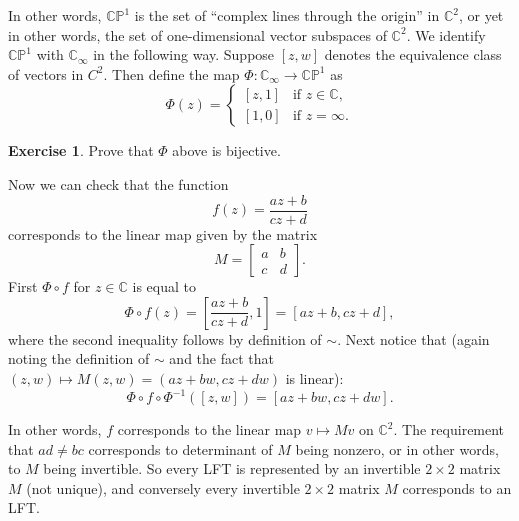 \documentclass[12pt,openany]{book}
\newcommand{\C}{{\mathbb{C}}}
\newcommand{\bP}{{\mathbb{P}}}
\theoremstyle{plain}
\theoremstyle{remark}
\theoremstyle{definition}
\newenvironment{exbox}{%
    \def\FrameCommand{\vrule width 1pt \relax\hspace {10pt}}%
    \MakeFramed {\advance \hsize -\width \FrameRestore }%
}{%
    \endMakeFramed
}
\theoremstyle{exercise}
\newtheorem{exercise}{Exercise}[section]
\theoremstyle{example}
\begin{document}
In other words, $\C \bP^1$ is the set of ``complex lines through the
origin'' in $\C^2$, or yet in other words, the set of one-dimensional vector
subspaces of $\C^2$.  We identify $\C\bP^1$ with $\C_\infty$ in the following
way.  Suppose $[z,w]$ denotes the equivalence class of vectors in $C^2$.
Then define the map $\Phi \colon \C_\infty \to \C \bP^1$ as
\begin{equation*}
\Phi(z) =
\begin{cases}
[z,1] & \text{if } z \in \C , \\
[1,0] & \text{if } z=\infty .
\end{cases}
\end{equation*}

\begin{exbox}
\begin{exercise}
Prove that $\Phi$ above is bijective.
\end{exercise}
\end{exbox}

Now we can check that the function
\begin{equation*}
f(z) = \frac{a z + b}{c z + d}
\end{equation*}
corresponds to the linear map given by the matrix
\begin{equation*}
M =
\begin{bmatrix}
a & b \\
c & d
\end{bmatrix} .
\end{equation*}
First $\Phi \circ f$ for $z \in \C$ is equal to
\begin{equation*}
\Phi \circ f(z) =
\left[\frac{a z + b}{c z + d}, 1 \right]
=
\left[a z + b, c z + d \right] ,
\end{equation*}
where the second inequality follows by definition of $\sim$.
Next notice that (again noting the definition of $\sim$
and the fact that $(z,w) \mapsto M(z,w) = (a z + b w, c z + d w)$ is
linear):
\begin{equation*}
\Phi \circ f \circ \Phi^{-1} ([z,w]) =
\left[a z + b w, c z + d w \right] .
\end{equation*}

In other words, $f$ corresponds to the linear map $v \mapsto Mv$ on $\C^2$.
The requirement that $ad \not= bc$ corresponds to determinant of $M$ being
nonzero, or in other words, to $M$ being invertible.
So every LFT is represented by an invertible $2 \times 2$ matrix $M$
(not unique), and
conversely every invertible $2 \times 2$ matrix $M$ corresponds to an LFT.
\end{document}
